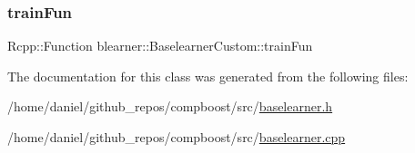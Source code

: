 \subsubsection{\texorpdfstring{train\+Fun}{trainFun}}
{\footnotesize\ttfamily Rcpp\+::\+Function blearner\+::\+Baselearner\+Custom\+::train\+Fun\hspace{0.3cm}{\ttfamily [private]}}



The documentation for this class was generated from the following files\+:\begin{DoxyCompactItemize}
\item 
/home/daniel/github\+\_\+repos/compboost/src/\hyperlink{baselearner_8h}{baselearner.\+h}\item 
/home/daniel/github\+\_\+repos/compboost/src/\hyperlink{baselearner_8cpp}{baselearner.\+cpp}\end{DoxyCompactItemize}
